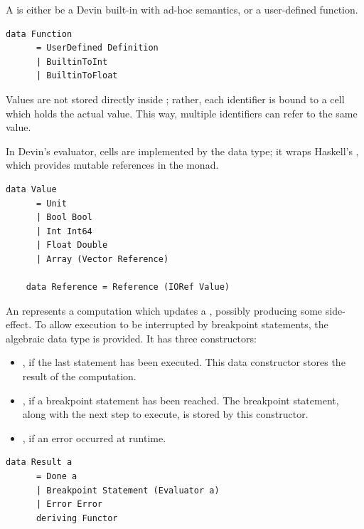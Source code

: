 \documentclass[UdineBachThesis,american,11pt]{PhdThesis}
\begin{document}
  A \lstinline@Function@ is either be a Devin built-in with ad-hoc semantics, or
  a user-defined function.

  \begin{lstlisting}[gobble=4,basicstyle=\ttfamily\small]
    data Function
      = UserDefined Definition
      | BuiltinToInt
      | BuiltinToFloat
  \end{lstlisting}

  Values are not stored directly inside \lstinline@State@; rather, each
  identifier is bound to a cell which holds the actual value. This way, multiple
  identifiers can refer to the same value.

  In Devin's evaluator, cells are implemented by the \lstinline@Reference@ data
  type; it wraps Haskell's \lstinline@IORef@, which provides mutable references
  in the \lstinline@IO@ monad.

  \begin{lstlisting}[gobble=4,basicstyle=\ttfamily\small]
    data Value
      = Unit
      | Bool Bool
      | Int Int64
      | Float Double
      | Array (Vector Reference)

    data Reference = Reference (IORef Value)
  \end{lstlisting}

  An \lstinline@Evaluator@ represents a computation which updates a
  \lstinline@State@, possibly producing some side-effect. To allow execution to
  be interrupted by breakpoint statements, the algebraic data type
  \lstinline@Result@ is provided. It has three constructors:

  \begin{itemize}
    \item \lstinline@Done@, if the last statement has been executed. This data
    constructor stores the result of the computation.

    \item \lstinline@Breakpoint@, if a breakpoint statement has been reached.
    The breakpoint statement, along with the next step to execute, is stored by
    this constructor.

    \item \lstinline@Error@, if an error occurred at runtime.
  \end{itemize}

  \begin{lstlisting}[gobble=4,basicstyle=\ttfamily\small]
    data Result a
      = Done a
      | Breakpoint Statement (Evaluator a)
      | Error Error
      deriving Functor
  \end{lstlisting}
\end{document}
